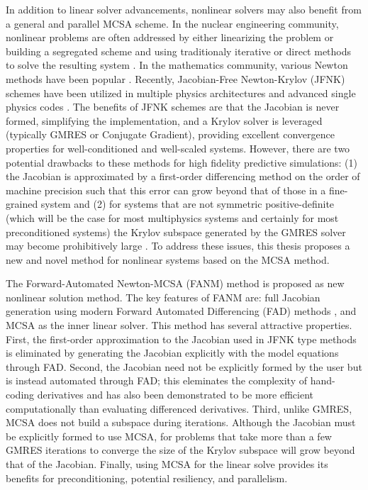 In addition to linear solver advancements, nonlinear solvers may also
benefit from a general and parallel MCSA scheme. In the nuclear
engineering community, nonlinear problems are often addressed by
either linearizing the problem or building a segregated scheme and
using traditionaly iterative or direct methods to solve the resulting
system \citep{pletcher_computational_1997}. In the mathematics
community, various Newton methods have been popular
\citep{kelley_iterative_1995}. Recently, Jacobian-Free Newton-Krylov
(JFNK) schemes \citep{knoll_jacobian-free_2004} have been utilized in
multiple physics architectures and advanced single physics codes
\citep{gaston_parallel_2009}. The benefits of JFNK schemes are that
the Jacobian is never formed, simplifying the implementation, and a
Krylov solver is leveraged (typically GMRES or Conjugate Gradient),
providing excellent convergence properties for well-conditioned and
well-scaled systems. However, there are two potential drawbacks to
these methods for high fidelity predictive simulations: (1) the
Jacobian is approximated by a first-order differencing method on the
order of machine precision such that this error can grow beyond that
of those in a fine-grained system \citep{kelley_iterative_1995} and
(2) for systems that are not symmetric positive-definite (which will
be the case for most multiphysics systems and certainly for most
preconditioned systems) the Krylov subspace generated by the GMRES
solver may become prohibitively large
\citep{knoll_newton-krylov_1995}. To address these issues, this thesis
proposes a new and novel method for nonlinear systems based on the
MCSA method.

The Forward-Automated Newton-MCSA (FANM) method is proposed as new
nonlinear solution method. The key features of FANM are: full Jacobian
generation using modern Forward Automated Differencing (FAD) methods
\citep{bartlett_automatic_2006}, and MCSA as the inner linear
solver. This method has several attractive properties. First, the
first-order approximation to the Jacobian used in JFNK type methods is
eliminated by generating the Jacobian explicitly with the model
equations through FAD. Second, the Jacobian need not be explicitly
formed by the user but is instead automated through FAD; this
eleminates the complexity of hand-coding derivatives and has also been
demonstrated to be more efficient computationally than evaluating
differenced derivatives. Third, unlike GMRES, MCSA does not build a
subspace during iterations. Although the Jacobian must be explicitly
formed to use MCSA, for problems that take more than a few GMRES
iterations to converge the size of the Krylov subspace will grow
beyond that of the Jacobian. Finally, using MCSA for the linear solve
provides its benefits for preconditioning, potential resiliency, and
parallelism.

